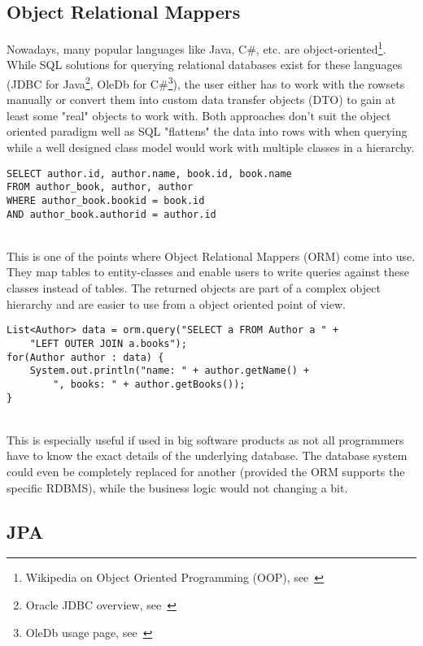 \subsection{Object Relational Mappers}
Nowadays, many popular languages like Java, C\#, etc. are object-oriented\footnote{Wikipedia on Object Oriented Programming (OOP), see~\cite{object_oriented_programming_wiki}}.
While SQL solutions for querying relational databases exist for these languages (JDBC for Java\footnote{Oracle JDBC overview, see~\cite{jdbc_oracle}}, OleDb for C\#\footnote{OleDb usage page, see~\cite{oledb_ms}}), the user either has to work with the rowsets manually or convert them into custom data transfer objects (DTO) to gain at least some "real" objects to work with. Both approaches don't suit the object oriented paradigm well as SQL "flattens" the data into rows with when querying while a well designed class model would work with multiple classes in a hierarchy.
\\
\lstset{language=sql}
\begin{lstlisting}[frame=htrbl, caption={SQL "flattening" the author and book table into rows}, label={lst:flattening.sql}]
SELECT author.id, author.name, book.id, book.name 
FROM author_book, author, author
WHERE author_book.bookid = book.id
AND author_book.authorid = author.id
\end{lstlisting}
~\\
This is one of the points where Object Relational Mappers (ORM) come into use. They map tables to entity-classes and
enable users to write queries against these classes instead of tables. The returned objects are part of a complex object hierarchy and are easier to use from a object oriented point of view.
\\
\lstset{language=java}
\begin{lstlisting}[frame=htrbl, caption={ORM query example}, label={lst:flattening.sql}]
List<Author> data = orm.query("SELECT a FROM Author a " +
	"LEFT OUTER JOIN a.books");
for(Author author : data) {
	System.out.println("name: " + author.getName() + 
		", books: " + author.getBooks());
}
\end{lstlisting}
~\\
This is especially useful if used in big software products as not all programmers have to know the exact details of the underlying database. The database system could even be completely replaced for another (provided the ORM supports the specific RDBMS), while the business logic would not changing a bit.

\subsection{JPA}

